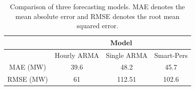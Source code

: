 \documentclass[review]{elsarticle}
\begin{document}
\begin{table}[t!]
\centering
\caption{Comparison of three forecasting models. MAE denotes the mean absolute 
error and RMSE denotes the root mean squared error.}
\label{tab:compare}
\begin{tabular}{c|ccc}
\toprule
\multicolumn{1}{l}{} & \multicolumn{3}{c}{Model}              \\ \hline
                     & Hourly ARMA & Single ARMA & Smart-Pers \\ \hline
MAE (MW)                 & 39.6        & 48.2        & 45.7   \\
RMSE (MW)                & 61          & 112.51      & 102.6   \\ \bottomrule
\end{tabular}
\end{table}
\end{document}
